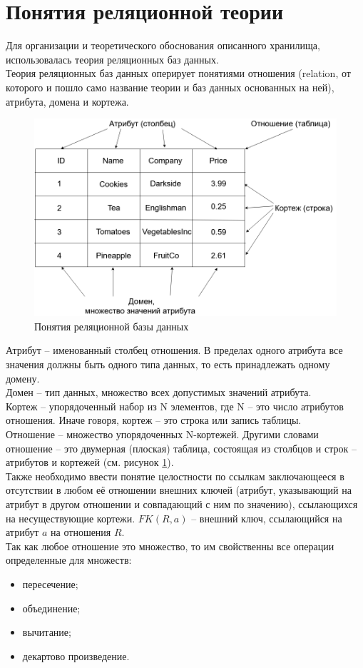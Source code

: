 \section{Понятия реляционной теории}
\indent Для организации и теоретического обоснования описанного хранилища, использовалась теория реляционных баз данных.\\
\indent Теория реляционных баз данных оперирует понятиями отношения (relation, от которого и пошло само название теории и баз данных основанных на ней), атрибута, домена и кортежа.

\begin{figure}[ht]
	\centering
	\includegraphics[width=\linewidth]{pics/databaseExample.png}
	\caption{Понятия реляционной базы данных}
	\label{fig:dbExample}
\end{figure}

\indent Атрибут -- именованный столбец отношения.
В пределах одного атрибута все значения должны быть одного типа данных, то есть принадлежать одному домену\cite{alice}.\\
\indent Домен -- тип данных, множество всех допустимых значений атрибута\cite{alice}.\\
\indent Кортеж -- упорядоченный набор из N элементов, где N -- это число атрибутов отношения\cite{alice}.
Иначе говоря, кортеж -- это строка или запись таблицы.\\
\indent Отношение -- множество упорядоченных N-кортежей\cite{alice}.
Другими словами отношение -- это двумерная (плоская) таблица, состоящая из столбцов и строк -- атрибутов и кортежей (см. рисунок \ref{fig:dbExample}).\\
\indent Также необходимо ввести понятие целостности по ссылкам заключающееся в отсутствии в любом её отношении внешних ключей (атрибут, указывающий на атрибут в другом отношении и совпадающий с ним по значению), ссылающихся на несуществующие кортежи\cite{grey}. $FK(R, a)$ -- внешний ключ, ссылающийся на атрибут $a$ на отношения $R$.\\
\indent Так как любое отношение это множество, то им свойственны все операции определенные для множеств\cite{il}:
\begin{itemize}
	\item пересечение;
	\item объединение;
	\item вычитание;
	\item декартово произведение.
\end{itemize}

